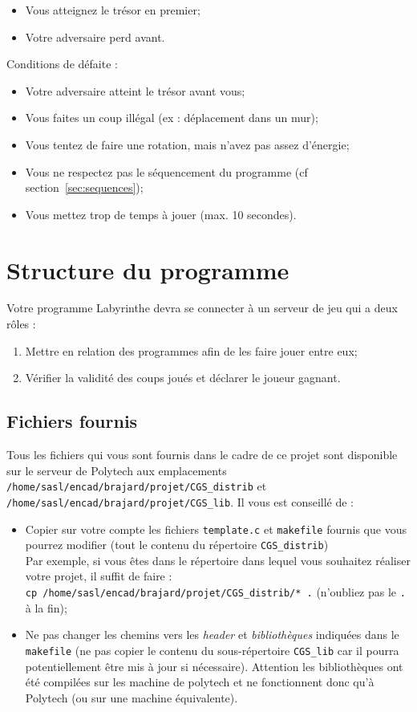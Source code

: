 \documentclass[french,12pt,a4paper,twoside,openright,titlepage]{report}
\begin{document}
\begin{itemize}
\item Vous atteignez le trésor en premier;
\item Votre adversaire perd avant.
\end{itemize}

Conditions de défaite :
\begin{itemize}
\item Votre adversaire atteint le trésor avant vous;
\item Vous faites un coup illégal (ex : déplacement dans un mur);
\item Vous tentez de faire une rotation, mais n'avez pas assez d'énergie;
\item Vous ne respectez pas le séquencement du programme (cf section~\ref{sec:sequences});
\item Vous mettez trop de temps à jouer (max. 10 secondes).
\end{itemize}


\section{Structure du programme}
Votre programme Labyrinthe devra se connecter à un serveur de jeu qui a deux rôles :
\begin{enumerate}
\item Mettre en relation des programmes afin de les faire jouer entre eux;
\item Vérifier la validité des coups joués et déclarer le joueur gagnant.
\end{enumerate}

\subsection{Fichiers fournis}
\label{sec:fourni}
Tous les fichiers qui vous sont fournis dans le cadre de ce projet sont disponible sur le serveur de Polytech
aux emplacements \verb|/home/sasl/encad/brajard/projet/CGS_distrib| et \verb|/home/sasl/encad/brajard/projet/CGS_lib|.
Il vous est conseillé de :
\begin{itemize}
\item Copier sur votre compte les fichiers \verb|template.c| et \verb|makefile| fournis que vous pourrez modifier (tout le contenu du répertoire \verb|CGS_distrib|)\\
Par exemple, si vous êtes dans le répertoire dans lequel vous souhaitez réaliser votre projet, il suffit de faire :\\
\verb|cp /home/sasl/encad/brajard/projet/CGS_distrib/* .|
(n'oubliez pas le \verb|.| à la fin);
\item Ne pas changer les chemins vers les \textit{header} et \textit{bibliothèques}  indiquées dans le \verb|makefile| (ne pas copier le contenu du sous-répertoire \verb|CGS_lib| car il pourra potentiellement être mis à jour si nécessaire). Attention les bibliothèques ont été compilées sur les machine de polytech et ne fonctionnent donc qu'à Polytech (ou sur une machine équivalente).
\end{itemize}
\end{document}
